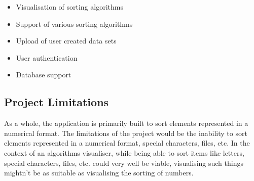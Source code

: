 \begin{itemize}
    \item Visualisation of sorting algorithms
    \item Support of various sorting algorithms
    \item Upload of user created data sets
    \item User authentication
    \item Database support
\end{itemize}

\subsection{Project Limitations}
As a whole, the application is primarily built to sort elements represented in a
numerical format. The limitations of the project would be the inability to sort 
elements represented in a numerical format, special characters, files, etc. In the context of an algorithms visualiser, while being able to sort items like letters, special characters, files, etc. could very well be viable, visualising such things mightn't be as suitable as visualising the sorting of numbers.
